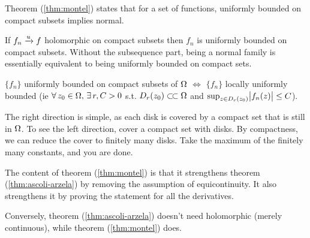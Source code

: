 \begin{remark}
Theorem (\ref{thm:montel}) states that for a set of functions, uniformly bounded on compact subsets implies normal.

If $f_n \xrightarrow[]{u} f$ holomorphic on compact subsets then $f_n$ is uniformly bounded on compact subsets. Without the subsequence part, being a normal family is essentially equivalent to being uniformly bounded on compact sets.
\end{remark}


\begin{remark}
$\{ f_n \}$ uniformly bounded on compact subsets of $\Omega$ $\iff$ $\{ f_n \}$ locally uniformly bounded (ie $\forall \, z_0 \in \Omega, \, \exists \, r,C > 0 $ s.t. $ D_r(z_0) \ssubset \om$ and $\sup_{z \in D_r(z_0)} \abs{f_n(z)} \leq C$).

The right direction is simple, as each disk is covered by a compact set that is still in $\Omega$. To see the left direction, cover a compact set with disks. By compactness, we can reduce the cover to finitely many disks. Take the maximum of the finitely many constants, and you are done.
\end{remark}

\begin{remark}
The content of theorem (\ref{thm:montel}) is that it strengthens theorem (\ref{thm:ascoli-arzela}) by removing the assumption of equicontinuity. It also strengthens it by proving the statement for all the derivatives.

Conversely, theorem (\ref{thm:ascoli-arzela}) doesn't need holomorphic (merely continuous), while theorem (\ref{thm:montel}) does.
\end{remark}

